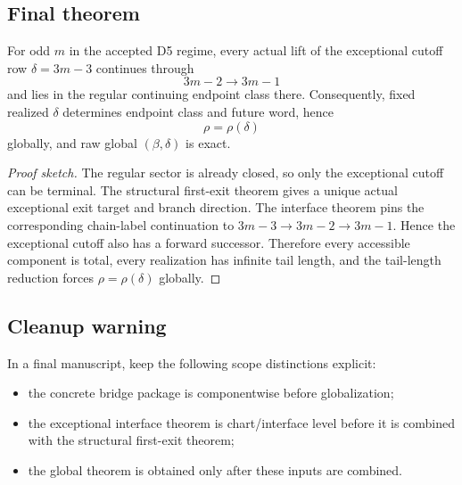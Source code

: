 \subsection{Final theorem}

\begin{theorem}
For odd $m$ in the accepted D5 regime, every actual lift of the exceptional
cutoff row $\delta=3m-3$ continues through
\[
3m-2 \to 3m-1
\]
and lies in the regular continuing endpoint class there.
Consequently, fixed realized $\delta$ determines endpoint class and future
word, hence
\[
\rho=\rho(\delta)
\]
globally, and raw global $(\beta,\delta)$ is exact.
\end{theorem}

\begin{proof}[Proof sketch]
The regular sector is already closed, so only the exceptional cutoff can be
terminal. The structural first-exit theorem gives a unique actual exceptional
exit target and branch direction. The interface theorem pins the corresponding
chain-label continuation to $3m-3 \to 3m-2 \to 3m-1$. Hence the exceptional
cutoff also has a forward successor. Therefore every accessible component is
total, every realization has infinite tail length, and the tail-length
reduction forces $\rho=\rho(\delta)$ globally.
\end{proof}

\subsection{Cleanup warning}

In a final manuscript, keep the following scope distinctions explicit:

\begin{itemize}
\item the concrete bridge package is componentwise before globalization;
\item the exceptional interface theorem is chart/interface level before it is
combined with the structural first-exit theorem;
\item the global theorem is obtained only after these inputs are combined.
\end{itemize}
